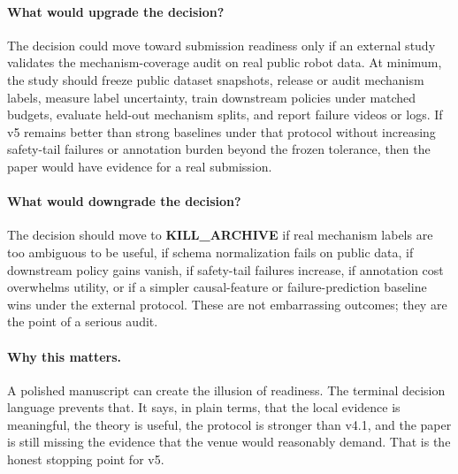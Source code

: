 \documentclass{article}
\begin{document}
\paragraph{What would upgrade the decision?}
The decision could move toward submission readiness only if an external study validates the mechanism-coverage audit on real public robot data. At minimum, the study should freeze public dataset snapshots, release or audit mechanism labels, measure label uncertainty, train downstream policies under matched budgets, evaluate held-out mechanism splits, and report failure videos or logs. If v5 remains better than strong baselines under that protocol without increasing safety-tail failures or annotation burden beyond the frozen tolerance, then the paper would have evidence for a real submission.

\paragraph{What would downgrade the decision?}
The decision should move to \textbf{KILL\_ARCHIVE} if real mechanism labels are too ambiguous to be useful, if schema normalization fails on public data, if downstream policy gains vanish, if safety-tail failures increase, if annotation cost overwhelms utility, or if a simpler causal-feature or failure-prediction baseline wins under the external protocol. These are not embarrassing outcomes; they are the point of a serious audit.

\paragraph{Why this matters.}
A polished manuscript can create the illusion of readiness. The terminal decision language prevents that. It says, in plain terms, that the local evidence is meaningful, the theory is useful, the protocol is stronger than v4.1, and the paper is still missing the evidence that the venue would reasonably demand. That is the honest stopping point for v5.

\begingroup
\raggedright


\endgroup
\end{document}
